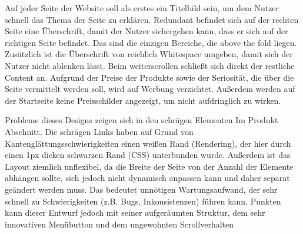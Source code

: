Auf jeder Seite der Website soll als erstes ein Titelbild sein, um dem Nutzer schnell das Thema der Seite zu erklären. Redundant befindet sich auf der rechten Seite eine Überschrift, damit der Nutzer sichergehen kann, dass er sich auf der richtigen Seite befindet. Das sind die einzigen Bereiche, die above the fold liegen. Zusätzlich ist die Überschrift von reichlich Whitespace umgeben, damit sich der Nutzer nicht ablenken lässt. Beim weiterscrollen schließt sich direkt der restliche Content an.
Aufgrund der Preise der Produkte sowie der Seriosität, die über die Seite vermittelt werden soll, wird auf Werbung verzichtet. Außerdem werden auf der Startseite keine Preisschilder angezeigt, um nicht aufdringlich zu wirken.

Probleme dieses Designs zeigen sich in den schrägen Elementen Im Produkt Abschnitt. Die schrägen Links haben auf Grund von Kantenglättungsschwierigkeiten einen weißen Rand (Rendering), der hier durch einen 1px dicken schwarzen Rand (CSS) unterbunden wurde. Außerdem ist das Layout ziemlich unflexibel, da die Breite der Seite von der Anzahl der Elemente abhängen sollte, sich jedoch nicht dynamisch anpassen kann und daher separat geändert werden muss. Das bedeutet unnötigen Wartungsaufwand, der sehr schnell zu Schwierigkeiten (z.B. Bugs, Inkonsistenzen) führen kann.
Punkten kann dieser Entwurf jedoch mit seiner aufgeräumten Struktur, dem sehr innovativen Menübutton und dem ungewohnten Scrollverhalten
